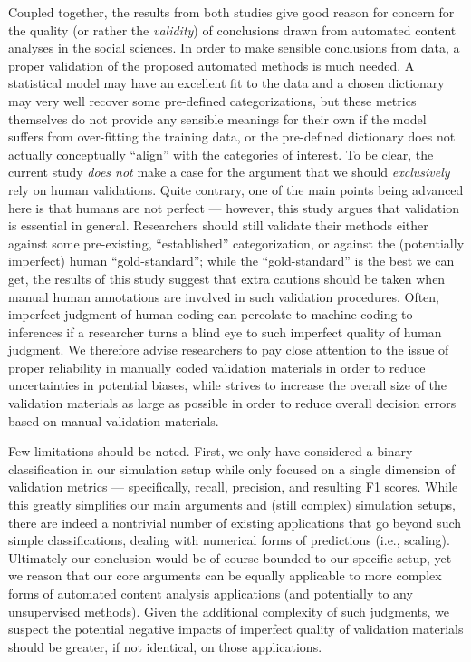 \documentclass[man, 12pt, a4paper, nolmodern, noextraspace]{apa6}
\begin{document}
    Coupled together, the results from both studies give good reason for concern for the quality (or rather the \textit{validity}) of conclusions drawn from automated content analyses in the social sciences. In order to make sensible conclusions from data, a proper validation of the proposed automated methods is much needed. A statistical model may have an excellent fit to the data and a chosen dictionary may very well recover some pre-defined categorizations, but these metrics themselves do not provide any sensible meanings for their own if the model suffers from over-fitting the training data, or the pre-defined dictionary does not actually conceptually \enquote{align} with the categories of interest. To be clear, the current study \textit{does not} make a case for the argument that we should \textit{exclusively} rely on human validations. Quite contrary, one of the main points being advanced here is that humans are not perfect --- however, this study argues that validation is essential in general. Researchers should still validate their methods either against some pre-existing, \enquote{established} categorization, or against the (potentially imperfect) human \enquote{gold-standard}; while the \enquote{gold-standard} is the best we can get, the results of this study suggest that extra cautions should be taken when manual human annotations are involved in such validation procedures. Often, imperfect judgment of human coding can percolate to machine coding to inferences if a researcher turns a blind eye to such imperfect quality of human judgment. We therefore advise researchers to pay close attention to the issue of proper reliability in manually coded validation materials in order to reduce uncertainties in potential biases, while strives to increase the overall size of the validation materials as large as possible in order to reduce overall decision errors based on manual validation materials.    

    Few limitations should be noted. First, we only have considered a binary classification in our simulation setup while only focused on a single dimension of validation metrics --- specifically, recall, precision, and resulting F1 scores. While this greatly simplifies our main arguments and (still complex) simulation setups, there are indeed a nontrivial number of existing applications that go beyond such simple classifications, dealing with numerical forms of predictions (i.e., scaling). Ultimately our conclusion would be of course bounded to our specific setup, yet we reason that our core arguments can be equally applicable to more complex forms of automated content analysis applications (and potentially to any unsupervised methods). Given the additional complexity of such judgments, we suspect the potential negative impacts of imperfect quality of validation materials should be greater, if not identical, on those applications. 
\end{document}
